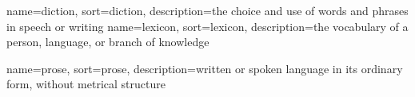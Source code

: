 


{
	name={diction},
	sort=diction,
	description={the choice and use of words and phrases in speech or writing}
}
{
	name={lexicon},
	sort=lexicon,
	description={the vocabulary of a person, language, or branch of knowledge}
}

{
	name={prose},
	sort=prose,
	description={written or spoken language in its ordinary form, without metrical structure}
}








